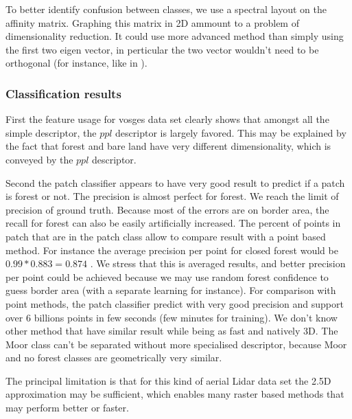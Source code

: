 		To better identify confusion between classes, we use a spectral layout on the affinity matrix.
		Graphing this matrix in 2D ammount to a problem of dimensionality reduction.
		It could use more advanced method than simply using the first two eigen vector,
		in perticular the two vector wouldn't need to be orthogonal (for instance, like in \cite{Hyvarinen2000}).
				 
	\subsubsection{Classification results}
		  First the feature usage for vosges data set clearly shows that amongst all the simple descriptor, the $ppl$ descriptor is largely favored.
		  This may be explained by the fact that forest and bare land have very different dimensionality, which is conveyed by the $ppl$ descriptor.
		  
		  Second the patch classifier appears to have very good result to predict if a patch is forest or not. The precision is almost perfect for forest. We reach the limit of precision of ground truth.
		  Because most of the errors are on border area, the recall for forest can also be easily artificially increased. The percent of points in patch that are in the patch class allow to compare result with a point based method. 
		  For instance the average precision per point for closed forest would be $0.99*0.883=0.874$ . We stress that this is averaged results, and better precision per point could be achieved because we may use random forest confidence to guess border area (with a separate learning for instance).
		  For comparison with point methods, the patch classifier predict with very good precision and support over 6 billions points in few seconds (few minutes for training). We don't know other method that have similar result while being as fast and natively 3D.
		   The Moor class can't be separated without more specialised descriptor, because Moor and no forest classes are geometrically very similar.
		  
		  The principal limitation is that for this kind of aerial Lidar data set the 2.5D approximation may be sufficient, which enables many raster based methods that may perform better or faster.
		  
